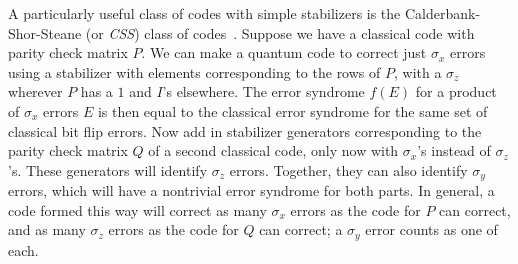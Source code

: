 \documentclass{report}
\newcommand{\X}{\sigma_x}
\newcommand{\Z}{\sigma_z}
\newcommand{\Y}{\sigma_y}
\begin{document}
A particularly useful class of codes with simple stabilizers is the 
Calderbank-Shor-Steane (or {\em CSS}) class of 
codes~\cite{calderbank-CSS,steane-CSS}.  Suppose we have a classical code 
with parity check matrix $P$.  We can make a quantum code to correct just 
$\X$ errors using a stabilizer with elements corresponding to the rows of 
$P$, with a $\Z$ wherever $P$ has a $1$ and $I$'s elsewhere.  The error 
syndrome $f(E)$ for a product of $\X$ errors $E$ is then equal to the 
classical error syndrome for the same set of classical bit flip errors.  Now 
add in stabilizer generators corresponding to the parity check matrix $Q$ 
of a second classical code, only now with $\X$'s instead of $\Z$'s.  These 
generators will identify $\Z$ errors.  Together, they can also identify $\Y$ 
errors, which will have a nontrivial error syndrome for both parts.  In
general, a code formed this way will correct as many $\X$ errors as the code 
for $P$ can correct, and as many $\Z$ errors as the code for $Q$ can correct; 
a $\Y$ error counts as one of each.
\end{document}
